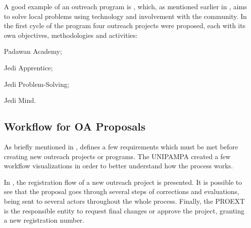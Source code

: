A good example of an outreach program is \textcite{JEDI}, which, as mentioned earlier in , aims to solve local problems using technology and involvement with the community. In the first cycle of the program four outreach projects were proposed, each with its own objectives, methodologies and activities:
\begin{inparaenum}[(i)]
  \item Padawan Academy;
  \item Jedi Apprentice;
  \item Jedi Problem-Solving;
  \item Jedi Mind.
\end{inparaenum}

\subsection{Workflow for \acl{OA} Proposals}\label{sec:bac-proposals}

As briefly mentioned in , \textcite{Resolucao-332:2021} defines a few requirements which must be met before creating new outreach projects or programs. The \acl{UNIPAMPA} created a few workflow visualizations in order to better understand how the process works.


In , the registration flow of a new outreach project is presented. It is possible to see that the proposal goes through several steps of corrections and evaluations, being sent to several actors throughout the whole process. Finally, the \acl{PROEXT} is the responsible entity to request final changes or approve the project, granting a new registration number.

